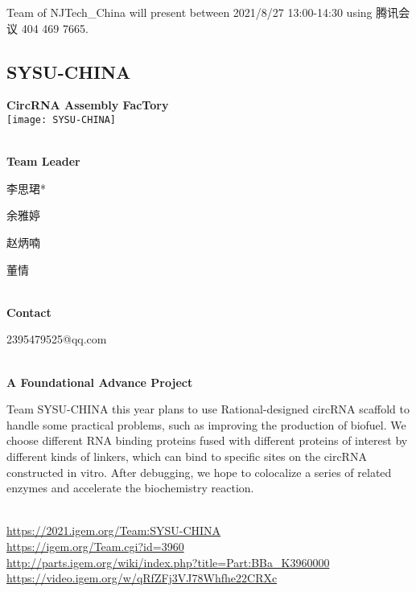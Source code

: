 \vfill{}









Team of NJTech\_China will present between 2021/8/27 13:00-14:30        using 腾讯会议 404 469 7665.
\newpage


\subsection{\textcolor{Blu}{ SYSU-CHINA } }
\vspace{5mm}
\begin{center}
\large{
  \textbf{ CircRNA Assembly FacTory }\\
  \texttt{[image: SYSU-CHINA]}
}
\end{center}
\textbf{\\Team Leader}

  李思珺*

  余雅婷

  赵炳喃

  董情


\textbf{\\Contact}

  2395479525@qq.com


\textbf{\\A Foundational Advance Project\\}\begin{spacing}{1.5}

Team SYSU-CHINA this year plans to use Rational-designed circRNA scaffold to handle some practical problems, such as improving the production of biofuel. We choose different RNA binding proteins fused with different proteins of interest by different kinds of linkers, which can bind to specific sites on the circRNA constructed in vitro. After debugging, we hope to colocalize a series of related enzymes and accelerate the biochemistry reaction.\end{spacing}
\\

\url{https://2021.igem.org/Team:SYSU-CHINA }\\
\url{https://igem.org/Team.cgi?id=3960 }\\
\url{http://parts.igem.org/wiki/index.php?title=Part:BBa_K3960000 }\\
\url{https://video.igem.org/w/qRfZFj3VJ78Whfhe22CRXc }\\

\vfill{}









